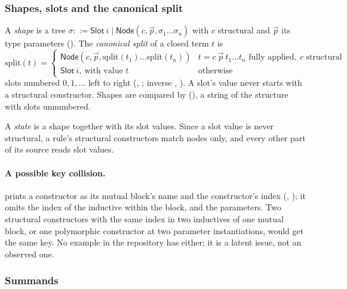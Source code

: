 \subsubsection{Shapes, slots and the canonical split}

\begin{definition}
A \emph{shape} is a tree $\sigma ::= \mathsf{Slot}\ i \mid
\mathsf{Node}(c, \vec p, \sigma_1\dots\sigma_n)$ with $c$ structural and
$\vec p$ its type parameters ().
The \emph{canonical split} of a closed term $t$ is
\[
\mathrm{split}(t) =
\begin{cases}
\mathsf{Node}(c,\vec p,\mathrm{split}(t_1)\dots\mathrm{split}(t_n)) &
  t = c\ \vec p\ t_1\dots t_n \text{ fully applied},\ c \text{ structural}\\
\mathsf{Slot}\ i,\ \text{with value } t & \text{otherwise}
\end{cases}
\]
slots numbered $0,1,\dots$ left to right (,
; inverse ,
). A slot's value never starts
with a structural constructor. Shapes are compared by 
(), a string of the structure
with slots unnumbered.
\end{definition}

A \emph{state} is a shape together with its slot values. Since a slot
value is never structural, a rule's structural constructors match nodes
only, and every other part of its source reads slot values.

\paragraph{A possible key collision.}  prints a constructor as
its mutual block's name and the constructor's index
(, ); it omits
the index of the inductive within the block, and the parameters. Two
structural constructors with the same index in two inductives of one
mutual block, or one polymorphic constructor at two parameter
instantiations, would get the same key. No example in the repository has
either; it is a latent issue, not an observed one.

\subsubsection{Summands}

